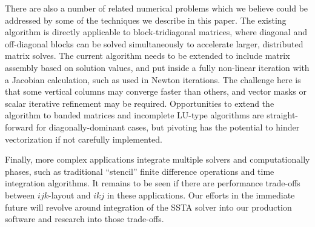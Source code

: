 \documentclass{sig-alternate-05-2015}
\begin{document}
There are also a number of related numerical problems which we believe could be
  addressed by some of the techniques we describe in this paper.
The existing algorithm is directly applicable to block-tridiagonal matrices,
  where diagonal and off-diagonal blocks can be solved simultaneously
  to accelerate larger, distributed matrix solves.
The current algorithm needs to be extended to include matrix assembly
  based on solution values, and put inside a fully non-linear iteration
  with a Jacobian calculation, such as used in Newton iterations.
The challenge here is that some vertical columns may converge faster than
  others, and vector masks or scalar iterative refinement may be required.
Opportunities to extend the algorithm to banded matrices and incomplete LU-type 
  algorithms are straight-forward for diagonally-dominant cases, but
  pivoting has the potential to hinder vectorization if not carefully
  implemented.

Finally, more complex applications integrate multiple solvers and
  computationally phases, such as traditional ``stencil'' finite difference
  operations and time integration algorithms. 
It remains to be seen if there are
  performance trade-offs between \(ijk\)-layout and \(ikj\) in these
  applications.
Our efforts in the immediate future will revolve around integration of the SSTA
  solver into our production software and research into those trade-offs.

%
\end{document}
